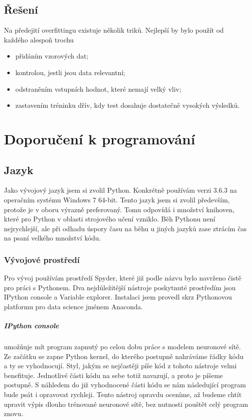 \documentclass[12pt,a4paper]{report}
\begin{document}
	\section{Řešení}
	Na předejití overfittingu existuje několik triků. Nejlepší by bylo použít od každého alespoň trochu
	\begin{itemize}
		\item přidáním vzorových dat;
		\item kontrolou, jestli jsou data relevantní;
		\item odstraněním vstupních hodnot, které nemají velký vliv;
		\item zastavením tréninku dřív, kdy test dosahuje dostatečně vysokých výsledků.
	\end{itemize}
	

\chapter{Doporučení k programování}
	\section{Jazyk}
	Jako vývojový jazyk jsem si zvolil Python. Konkrétně používám verzi 3.6.3 na operačním systému Windows 7 64-bit. Tento jazyk jsem si zvolil především, protože je v oboru výrazně preferovaný. Tomu odpovídá i množství knihoven, které pro Python v oblasti strojového učení vzniklo. Běh Pythonu není nejrychlejší, ale při odhadu úspory času na běhu u jiných jazyků zase ztrácím čas na psaní velkého množství kódu.
		\subsection{Vývojové prostředí}
		Pro vývoj používám prostředí Spyder, které již podle názvu  bylo navrženo čistě pro práci s Pythonem. Dva nejdůležitější nástroje poskytnuté prostředím jsou IPython console a Variable explorer. Instalaci jsem provedl skrz Pythonovou platformu pro data science jménem Anaconda.
		\paragraph{IPython console}
		umožňuje mít program zapnutý po celou dobu práce s modelem neuronové sítě. Ze začátku se zapne Python kernel, do kterého postupně nahráváme řádky kódu a ty se vyhodnocují. Styl, jakým se nejčastěji píše kód z tohoto nástroje velmi benefituje. Jednotlivé části kódu na sebe totiž navazují, a proto je píšeme postupně. S náhledem do již vyhodnocené části kódu se nám následující program bude psát i opravovat rychleji. Tento nástroj opravdu oceníme, až budeme chtít upravit výpis dlouho trénované neuronové sítě, bez nutnosti pouštět celý program znovu.
\end{document}
